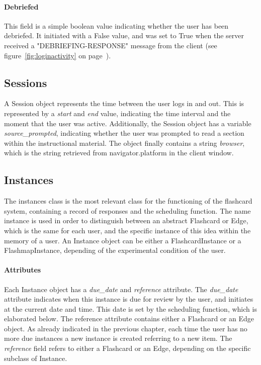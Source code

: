 \paragraph{Debriefed} This field is a simple boolean value indicating whether the user has been debriefed. It initiated with a False value, and was set to True when the server received a "DEBRIEFING-RESPONSE" message from the client (see figure~\ref{fig:loginactivity} on page~\pageref{fig:loginactivity}).

\subsection{Sessions}

A Session object represents the time between the user logs in and out. This is represented by a \emph{start} and \emph{end} value, indicating the time interval and the moment that the user was active. Additionally, the Session object has a variable \emph{source\_prompted}, indicating whether the user was prompted to read a section within the instructional material. The object finally contains a string \emph{browser}, which is the string retrieved from navigator.platform in the client window.

\subsection{Instances}

The instances class is the most relevant class for the functioning of the flashcard system, containing a record of responses and the scheduling function. The name instance is used in order to distinguish between an abstract Flashcard or Edge, which is the same for each user, and the specific instance of this idea within the memory of a user. An Instance object can be either a FlashcardInstance or a FlashmapInstance, depending of the experimental condition of the user.

\paragraph{Attributes} Each Instance object has a \emph{due\_date} and \emph{reference} attribute. The \emph{due\_date} attribute indicates when this instance is due for review by the user, and initiates at the current date and time. This date is set by the scheduling function, which is elaborated below. The reference attribute contains either a Flashcard or an Edge object. As already indicated in the previous chapter, each time the user has no more due instances a new instance is created referring to a new item. The \emph{reference} field refers to either a Flashcard or an Edge, depending on the specific subclass of Instance.

